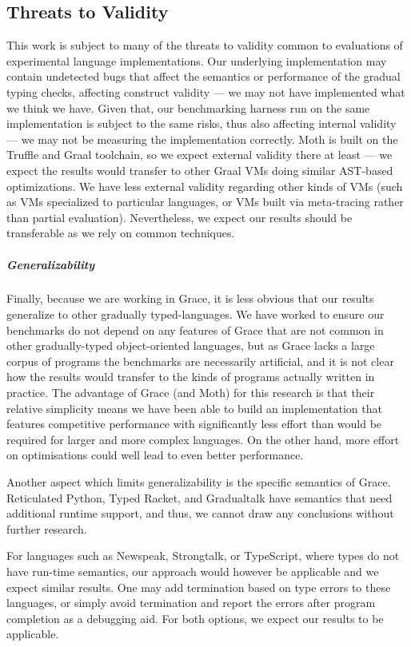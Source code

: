 \subsection{Threats to Validity}


This work is subject to many of the threats to validity common to
evaluations of experimental language implementations.  Our underlying
implementation may contain undetected bugs that affect the semantics
or performance of the gradual typing checks, affecting construct
validity --- we may not have implemented what we think we have. Given
that, our benchmarking harness run on the same implementation is
subject to the same risks, thus also affecting internal validity ---
we may not be measuring the implementation correctly.  Moth is built
on the Truffle and Graal toolchain, so we expect external validity
there at least --- we expect the results would transfer to other Graal
VMs doing similar AST-based optimizations.  We have less external
validity regarding other kinds of VMs (such as VMs specialized to 
particular languages, or VMs built via meta-tracing rather than partial evaluation). 
Nevertheless, we expect our results should be transferable
as we rely on common techniques.


\subparagraph{Generalizability}
Finally, because we are working in Grace, it is less obvious that our
results generalize to other gradually typed-languages. We have worked
to ensure \eg our benchmarks do not depend on any features of Grace
that are not common in other gradually-typed object-oriented
languages, but as Grace lacks a large corpus of programs the
benchmarks are necessarily artificial, and it is not clear how the
results would transfer to the kinds of programs actually written in
practice. The advantage of Grace (and Moth) for this research is
that their relative simplicity means we have been able to build an
implementation that features competitive performance with significantly less
effort than would be required for larger and more complex languages.
On the other hand, more effort on optimisations could well lead to
even better performance.

Another aspect which limits generalizability is the specific semantics of Grace.
Reticulated Python, Typed Racket, and Gradualtalk have semantics that need
additional runtime support, and thus, we cannot draw any conclusions without
further research.

For languages such as Newspeak, Strongtalk, or TypeScript,
where types do not have run-time semantics,
our approach would however be applicable and we expect similar results.
One may add termination based on type errors to these languages,
or simply avoid termination and report the errors after program completion
as a debugging aid.
For both options, we expect our results to be applicable.
